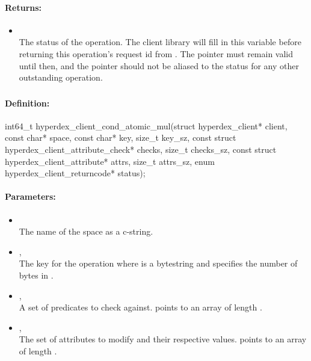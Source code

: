 \paragraph{Returns:}
\begin{itemize}[noitemsep]
\item {}\\
The status of the operation.  The client library will fill in this variable before returning this operation's request id from .  The pointer must remain valid until then, and the pointer should not be aliased to the status for any other outstanding operation.
\end{itemize}

\pagebreak
\subsubsection{}
\label{api:c:cond_atomic_mul}


\paragraph{Definition:}
\begin{ccode}
int64_t hyperdex_client_cond_atomic_mul(struct hyperdex_client* client,
        const char* space,
        const char* key, size_t key_sz,
        const struct hyperdex_client_attribute_check* checks, size_t checks_sz,
        const struct hyperdex_client_attribute* attrs, size_t attrs_sz,
        enum hyperdex_client_returncode* status);
\end{ccode}

\paragraph{Parameters:}
\begin{itemize}[noitemsep]
\item {}\\
The name of the space as a c-string.
\item {}, \\
The key for the operation where  is a bytestring and  specifies the number of bytes in .
\item {}, \\
A set of predicates to check against.   points to an array of length .
\item {}, \\
The set of attributes to modify and their respective values.   points to an array of length .
\end{itemize}

